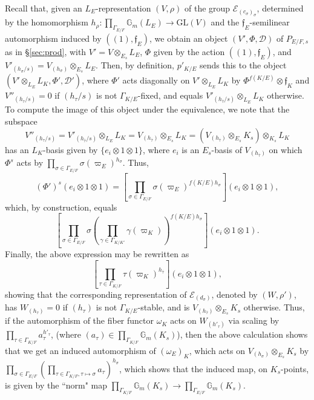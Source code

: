 \documentclass[11pt]{amsart}
\theoremstyle{definition}
\newcommand{\mc}{\mathcal}
\newcommand{\mf}{\mathfrak}
\begin{document}
Recall that, given an $L_{E}$-representation $(V, \rho)$ of the group $\mc{E}_{(c_{\sigma})_{\sigma}}$, determined by the homomorphism $h_{\rho} \colon \prod_{\Gamma_{E/F}} \mathbb{G}_{m}(L_{E}) \to \mathrm{GL}(V)$ and the $\mf{f}_{E}$-semilinear automorphism induced by $((1),\mf{f}_{E})$, we obtain an object $(V', \Phi, \mc{D})$ of $P_{E/F,s}$ as in \S \ref{sec:prod}, with $V' = V \otimes_{E_{s}} L_{E}$, $\Phi$ given by the action $((1),\mf{f}_{E})$, and $V'_{(h_{\sigma}/s)} = V_{(h_{\sigma})} \otimes_{E_{s}} L_{E}$. Then, by definition, $p'_{K/E}$ sends this to the object $(V' \otimes_{L_{E}} L_{K}, \Phi', \mc{D}')$, where $\Phi'$ acts diagonally on $ V' \otimes_{L_{E}} L_{K}$ by $\Phi^{f(K/E)} \otimes \mf{f}_{K}$ and $V''_{(h_{\tau}/s)} = 0$ if $(h_{\tau}/s)$ is not $\Gamma_{K/E}$-fixed, and equals $V'_{(h_{\bar{\tau}}/s)} \otimes_{L_{E}} L_{K}$ otherwise. To compute the image of this object under the equivalence, we note that the subspace $$V''_{(h_{\tau}/s)} = V'_{(h_{\bar{\tau}}/s)} \otimes_{L_{E}} L_{K} = V_{(h_{\bar{\tau}})} \otimes_{E_{s}} L_{K} = (V_{(h_{\bar{\tau}})} \otimes_{E_{s}} K_{s}) \otimes_{K_{s}} L_{K}$$ has an $L_{K}$-basis given by $\{e_{i} \otimes 1 \otimes 1\}$, where $e_{i}$ is an $E_{s}$-basis of $V_{(h_{\bar{\tau}})}$ on which $\Phi^{s}$ acts by $\prod_{\sigma \in \Gamma_{E/F}} \sigma(\varpi_{E})^{h_{\sigma}}$. Thus, $$(\Phi')^{s}(e_{i} \otimes 1 \otimes 1) =[\prod_{\sigma \in \Gamma_{E/F}} \sigma(\varpi_{E})^{f(K/E)h_{\sigma}}] (e_{i} \otimes 1 \otimes 1),$$ which, by construction, equals $$[\prod_{\sigma \in \Gamma_{E/F}} \sigma(\prod_{\gamma \in \Gamma_{K/K'}} \gamma(\varpi_{K}))^{f(K/E)h_{\sigma}}](e_{i} \otimes 1 \otimes 1).$$ Finally, the above expression may be rewritten as $$[\prod_{\tau \in \Gamma_{K/F}} \tau(\varpi_{K})^{h_{\bar{\tau}}}] (e_{i} \otimes 1 \otimes 1),$$ showing that the corresponding representation of $\mc{E}_{(d_{\sigma})}$, denoted by $(W, \rho')$, has $W_{(h_{\tau})} = 0$ if $(h_{\tau})$ is not $\Gamma_{K/E}$-stable, and is $V_{(h_{\bar{\tau}})} \otimes_{E_{s}} K_{s}$ otherwise. Thus, if the automorphism of the fiber functor $\omega_{K}$ acts on $W_{(h'_{\tau})}$ via scaling by $\prod_{\tau \in \Gamma_{K/F}} a_{\tau}^{h'_{\tau}}$, (where $(a_{\tau}) \in \prod_{\Gamma_{K/F}} \mathbb{G}_{m}(K_{s})$), then the above calculation shows that we get an induced automorphism of $(\omega_{E})_{K}$, which acts on $V_{(h_{\sigma})} \otimes_{E_{s}} K_{s}$ by $\prod_{\sigma \in \Gamma_{E/F}} (\prod_{\tau \in \Gamma_{K/F}, \tau \mapsto \sigma} a_{\tau})^{h_{\sigma}}$, which shows that the induced map, on $K_{s}$-points, is given by the ``norm" map $\prod_{\Gamma_{K/F}} \mathbb{G}_{m}(K_{s}) \to \prod_{\Gamma_{E/F}} \mathbb{G}_{m}(K_{s})$. 
\end{document}
